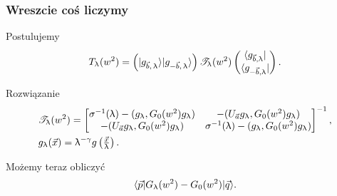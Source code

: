 \documentclass[10pt,t]{beamer}
\begin{document}
\begin{frame}
  \frametitle{Wreszcie coś liczymy}


  Postulujemy
  \begin{equation}
    \label{eq:Efekt-Casimira-29}
    T_{ \uplambda }( w^{ 2 } ) =
    \left( | g_{ \vec{ b },\, \uplambda } \rangle | g_{ -\vec{ b },\, \uplambda } \rangle \right)
    \mathcal{T}_{ \uplambda }( w^{ 2 } )
    \begin{pmatrix}
      \langle g_{ \vec{ b }, \uplambda } | \\
      \langle g_{ -\vec{ b }, \uplambda } |
    \end{pmatrix}.
  \end{equation}

  Rozwiązanie
  \begin{subequations}
    \begin{align}
      \label{eq:Efekt-Casimira-30-A}
      &\mathcal{T}_{ \uplambda }( w^{ 2 } ) =
      \begin{bmatrix}
        \sigma^{ -1 }( \uplambda )
        - ( g_{ \uplambda }, G_{ 0 }( w^{ 2 } ) g_{ \uplambda } )
        & -( U_{ \vec{ a } } g_{ \uplambda }, G_{ 0 }( w^{ 2 } ) g_{ \uplambda } ) \\
        -( U_{ \vec{ a } } g_{ \uplambda }, G_{ 0 }( w^{ 2 } ) g_{ \uplambda } )
        & \sigma^{ -1 }( \uplambda )
          - ( g_{ \uplambda }, G_{ 0 }( w^{ 2 } ) g_{ \uplambda } )
      \end{bmatrix}^{ -1 }, \\
      \label{eq:Efekt-Casimira-30-B}
      &g_{ \uplambda }( \vec{ x } ) =
      \uplambda^{ -\gamma } g\left( \tfrac{ \vec{ x } }{ \uplambda } \right).
    \end{align}
  \end{subequations}

  Możemy teraz obliczyć
  \begin{equation}
    \label{eq:Efekt-Casimira-31}
    \langle \vec{ p } | G_{ \uplambda }( w^{ 2 } ) - G_{ 0 }( w^{ 2 } ) | \vec{ q } \rangle.
  \end{equation}

\end{frame}
\end{document}
